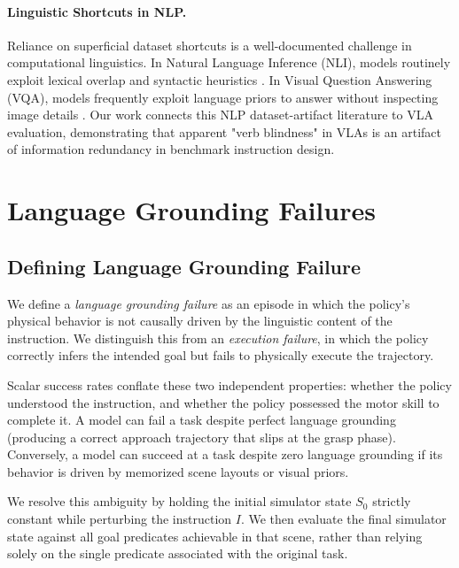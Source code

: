 \documentclass[11pt]{article}
\begin{document}
\paragraph{Linguistic Shortcuts in NLP.} Reliance on superficial dataset shortcuts is a well-documented challenge in computational linguistics. In Natural Language Inference (NLI), models routinely exploit lexical overlap and syntactic heuristics \citep{gururangan2018annotation,mccoy2019right}. In Visual Question Answering (VQA), models frequently exploit language priors to answer without inspecting image details \citep{goyal2017making}. Our work connects this NLP dataset-artifact literature to VLA evaluation, demonstrating that apparent "verb blindness" in VLAs is an artifact of information redundancy in benchmark instruction design.

\section{Language Grounding Failures}
\label{sec:language-grounding-failures}

\subsection{Defining Language Grounding Failure}
\label{subsec:defining-failure}

We define a \emph{language grounding failure} as an episode in which the policy's physical behavior is not causally driven by the linguistic content of the instruction. We distinguish this from an \emph{execution failure}, in which the policy correctly infers the intended goal but fails to physically execute the trajectory. 

Scalar success rates conflate these two independent properties: whether the policy understood the instruction, and whether the policy possessed the motor skill to complete it. A model can fail a task despite perfect language grounding (producing a correct approach trajectory that slips at the grasp phase). Conversely, a model can succeed at a task despite zero language grounding if its behavior is driven by memorized scene layouts or visual priors.

We resolve this ambiguity by holding the initial simulator state $S_0$ strictly constant while perturbing the instruction $I$. We then evaluate the final simulator state against all goal predicates achievable in that scene, rather than relying solely on the single predicate associated with the original task.
\end{document}
